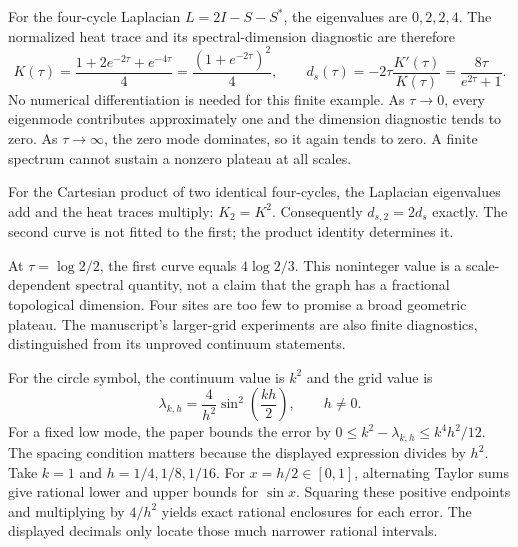 For the four-cycle Laplacian $L=2I-S-S^*$, the eigenvalues are $0,2,2,4$. The normalized heat trace and its spectral-dimension diagnostic are therefore
\[
K(\tau)=\frac{1+2e^{-2\tau}+e^{-4\tau}}4
=\frac{(1+e^{-2\tau})^2}4,
\qquad
 d_s(\tau)=-2\tau\frac{K'(\tau)}{K(\tau)}
=\frac{8\tau}{e^{2\tau}+1}.
\]
No numerical differentiation is needed for this finite example.
As $\tau\to0$, every eigenmode contributes approximately one and the dimension diagnostic tends to zero. As $\tau\to\infty$, the zero mode dominates, so it again tends to zero. A finite spectrum cannot sustain a nonzero plateau at all scales.

For the Cartesian product of two identical four-cycles, the Laplacian eigenvalues add and the heat traces multiply: $K_2=K^2$. Consequently $d_{s,2}=2d_s$ exactly. The second curve is not fitted to the first; the product identity determines it.

At $\tau=\log2/2$, the first curve equals $4\log2/3$. This noninteger value is a scale-dependent spectral quantity, not a claim that the graph has a fractional topological dimension. Four sites are too few to promise a broad geometric plateau. The manuscript's larger-grid experiments are also finite diagnostics, distinguished from its unproved continuum statements.

For the circle symbol, the continuum value is $k^2$ and the grid value is
\[
\lambda_{k,h}=\frac4{h^2}\sin^2\!\left(\frac{kh}{2}\right),\qquad h\ne0.
\]
For a fixed low mode, the paper bounds the error by $0\le k^2-\lambda_{k,h}\le k^4h^2/12$. The spacing condition matters because the displayed expression divides by $h^2$.
Take $k=1$ and $h=1/4,1/8,1/16$. For $x=h/2\in[0,1]$, alternating Taylor sums give rational lower and upper bounds for $\sin x$. Squaring these positive endpoints and multiplying by $4/h^2$ yields exact rational enclosures for each error. The displayed decimals only locate those much narrower rational intervals.

